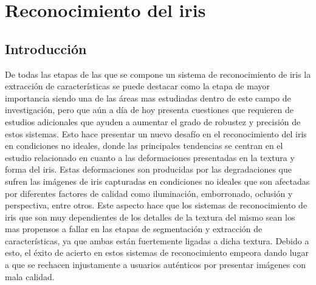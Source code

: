 
\chapter{Reconocimiento del iris} %

\label{Capítulo 5} %




\section{Introducción}

De todas las etapas de las que se compone un sistema de reconocimiento de iris la extracción de características se puede destacar como la etapa de mayor importancia siendo una de las áreas mas estudiadas dentro de este campo de investigación, pero que aún a día de hoy presenta cuestiones que requieren de estudios adicionales que ayuden a aumentar el grado de robustez y precisión de estos sistemas. Esto hace presentar un nuevo desafío en el reconocimiento del iris en condiciones no ideales, donde las principales tendencias se centran en el estudio relacionado en cuanto a las deformaciones presentadas en la textura y forma del iris. Estas deformaciones son producidas por las degradaciones que sufren las imágenes de iris capturadas en condiciones no ideales que son afectadas por diferentes factores de calidad como iluminación, emborronado, oclusión y perspectiva, entre otros. Este aspecto hace que los sistemas de reconocimiento de iris que son muy dependientes de los detalles de la textura del mismo sean los mas propensos a fallar en las etapas de segmentación y extracción de características, ya que ambas están fuertemente ligadas a dicha textura. Debido a esto, el éxito de acierto en estos sistemas de reconocimiento empeora dando lugar a que se rechacen injustamente a usuarios auténticos por presentar imágenes con mala calidad. \\ \\ 


